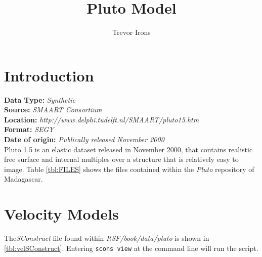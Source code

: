 \title{Pluto Model}
\author{Trevor Irons}

\maketitle
\lstset{language=python,numbers=left,numberstyle=\tiny,showstringspaces=false}

\section{Introduction} 
\textbf {Data Type:} \emph{Synthetic}\\
\textbf {
        Source:} \emph{SMAART Consortium}\\
\textbf {
        Location:} \emph{http://www.delphi.tudelft.nl/SMAART/pluto15.htm}\\
\textbf {
        Format:} \emph{SEGY} \\
\textbf{
        Date of origin:} \emph{Publically released November 2000}\\

Pluto 1.5 is an elastic dataset released in November 2000, that contains realistic free surface and internal multiples over a structure that is relatively easy to image. Table \ref{tbl:FILES} shows the files contained within the \emph{Pluto} repository of Madagascar.  

{
\tiny

\normalsize
}

\section{Velocity Models}
The\emph{SConstruct} file found within \emph{RSF/book/data/pluto} is shown in \ref{tbl:velSConstruct}.  Entering \texttt{scons view} at the command line will run the script.  

\tiny

\normalsize
        

